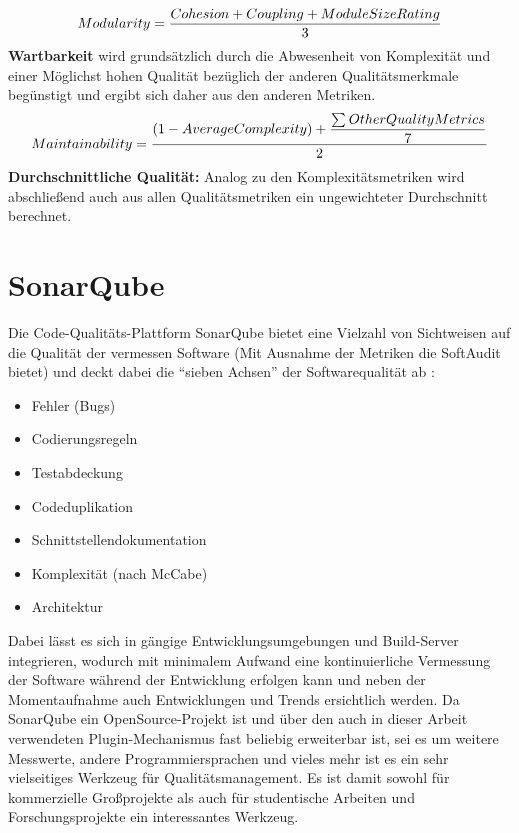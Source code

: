 \documentclass[gb,ngerman]{stthesis}
\begin{document}
			\begin{equation}
				\small{Modularity = \dfrac{Cohesion + Coupling + ModuleSizeRating}{3}} 
			\end{equation}  
			\textbf{Wartbarkeit} wird grundsätzlich durch die Abwesenheit von Komplexität und einer Möglichst hohen Qualität bezüglich der anderen Qualitätsmerkmale begünstigt und ergibt sich daher aus den anderen Metriken.
			\begin{equation}
				\small{Maintainability = \dfrac{(1 - AverageComplexity) + \dfrac{\sum_{}{} OtherQualityMetrics}{7}}{2}} 
			\end{equation} 
			\textbf{Durchschnittliche Qualität:} Analog zu den Komplexitätsmetriken wird abschließend auch aus allen Qualitätsmetriken ein ungewichteter Durchschnitt berechnet. 
     \section{SonarQube}
     	Die Code-Qualitäts-Plattform SonarQube bietet eine Vielzahl von Sichtweisen auf die Qualität der vermessen Software (Mit Ausnahme der Metriken die SoftAudit bietet) und deckt dabei die "`sieben Achsen"' der Softwarequalität ab \cite{SonarQubeInAction}:
     	\begin{itemize}
     		\item Fehler (Bugs)
     		\item Codierungsregeln
     		\item Testabdeckung
     		\item Codeduplikation
     		\item Schnittstellendokumentation
     		\item Komplexität (nach McCabe)
     		\item Architektur
		\end{itemize}     	
		Dabei lässt es sich in gängige Entwicklungsumgebungen und Build-Server integrieren, wodurch mit minimalem Aufwand eine kontinuierliche Vermessung der Software während der Entwicklung erfolgen kann und neben der Momentaufnahme auch Entwicklungen und Trends ersichtlich werden. \newline
		Da SonarQube ein OpenSource-Projekt ist und über den auch in dieser Arbeit verwendeten Plugin-Mechanismus fast beliebig erweiterbar ist, sei es um weitere Messwerte, andere Programmiersprachen und vieles mehr ist es ein sehr vielseitiges Werkzeug für Qualitätsmanagement. Es ist damit sowohl für kommerzielle Großprojekte als auch für studentische Arbeiten und Forschungsprojekte ein interessantes Werkzeug. \newline
\end{document}
